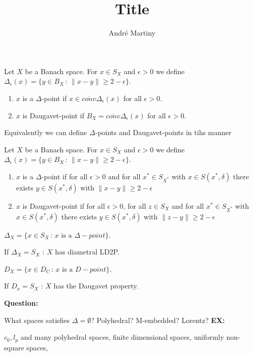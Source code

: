 \documentclass{article}
\title{Title}
\author{André Martiny}
\date{}
\begin{document}
\maketitle
\begin{defn}
Let $X$ be a Banach space. For $x\in S_X$ and $\epsilon>0$ we define $\Delta_\epsilon(x) = \{y\in B_X \,:\, \|x-y\| \geq 2-\epsilon\}$.
\begin{enumerate}[label={(\roman*)}]
    \item $x$ is a $\Delta$-point if $x\in \overline{conv}{\Delta_\epsilon(x)}$ for all $\epsilon>0$. \\
    \item $x$ is Daugavet-point if $B_X =  \overline{conv}{\Delta_\epsilon(x)}$ for all $\epsilon>0$. 
\end{enumerate}
\end{defn}
Equivalently we can define $\Delta$-points and Daugavet-points in tihs manner
\begin{defn}
Let $X$ be a Banach space. For $x\in S_X$ and $\epsilon>0$ we define $\Delta_\epsilon(x) = \{y\in B_X \,:\, \|x-y\| \geq 2-\epsilon\}$.
\begin{enumerate}[label={(\roman*)}]
    \item $x$ is a $\Delta$-point if for all $\epsilon>0$ and for all $x^*\in S_{X^*}$ with $x\in S(x^*, \delta)$ there exists $y\in S(x^*, \delta)$ with $\|x-y\|\geq 2-\epsilon$\\
    \item $x$ is Daugavet-point if for all $\epsilon>0$, for all $z\in S_X$ and for all $x^*\in S_{X^*}$ with $x\in S(x^*, \delta)$ there exists $y\in S(x^*, \delta)$ with $\|z-y\|\geq 2-\epsilon$
\end{enumerate}
\end{defn}
\begin{defn}

$\Delta_X = \{x \in S_X \,:\, x \text{ is a } \Delta-point \}$.

If $\Delta_X = S_X$ : $X$ has diametral LD2P.

$D_X = \{x \in D_C \,:\, x \text{ is a } D-point\}$.

If $D_x = S_X$ : $X$ has the Daugavet property.
\end{defn}

\textbf{Question:}

What spaces satisfies $\Delta = \emptyset$? Polyhedral? M-embedded? Lorentz?
\textbf{EX:}

$c_0, l_p$ and many polyhedral spaces, finite dimensional spaces, uniformly non-square spaces, 
\end{document}
